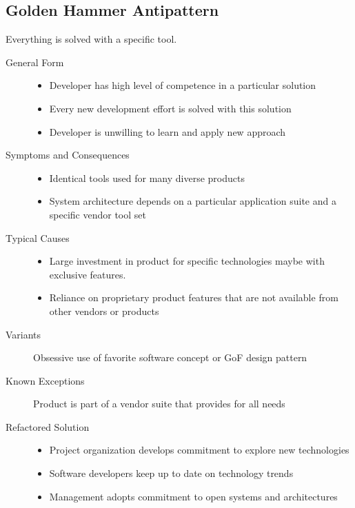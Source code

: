 \subsection{Golden Hammer Antipattern}
Everything is solved with a specific tool.
\begin{description}
	\item[General Form]
	\begin{itemize}
		\item Developer has high level of competence in a particular solution
	    \item Every new development effort is solved with this solution
	    \item Developer is unwilling to learn and apply new approach
	\end{itemize}
	\item[Symptoms and Consequences]
	\begin{itemize}
	  	\item Identical tools used for many diverse products
	  	\item System architecture depends on a particular application suite and a
  	specific vendor tool set
	\end{itemize}
	\item[Typical Causes]
	\begin{itemize}
	  	\item Large investment in product for specific technologies maybe with exclusive features.
	  	\item Reliance on proprietary product features that are not available from
	  	other vendors or products
	\end{itemize}
	\item[Variants] Obsessive use of favorite software concept or GoF design pattern
	\item[Known Exceptions] Product is part of a vendor suite that provides for all needs
	\item[Refactored Solution]
	\begin{itemize}
		\item Project organization develops commitment to explore new technologies
		\item Software developers keep up to date on technology trends
		\item Management adopts commitment to open systems and architectures
	\end{itemize}
\end{description}
\newpage

